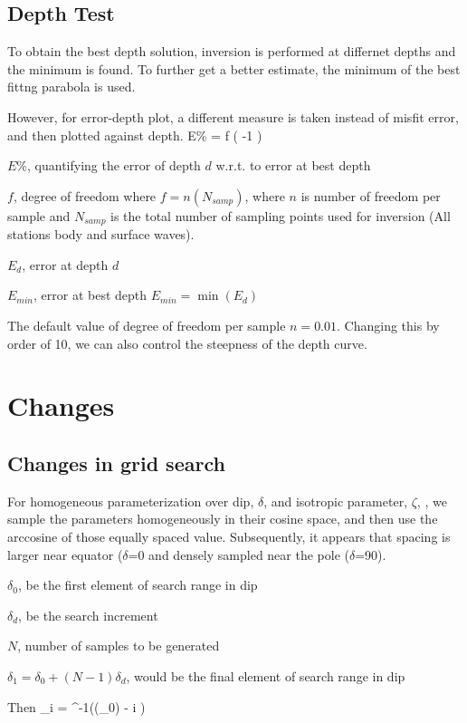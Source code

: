 \documentclass[11pt,titlepage,fleqn]{article}
\newcommand{\bdes}{\begin{description}}
\newcommand{\edes}{\end{description}}
\begin{document}
\subsection{Depth Test}
To obtain the best depth solution, inversion is performed at differnet depths and the minimum is found. To further get a better estimate, the minimum of the best fittng parabola is used.

However, for error-depth plot, a different measure is taken instead of misfit error, and then plotted against depth.
\eq
E\% = f \times \left (  -1 \right )
\en
\bdes
\item $E\%$, quantifying the error of depth $d$ w.r.t. to error at best depth
\item $f$, degree of freedom where $f = n (N_{samp})$, where $n$ is number of freedom per sample and $N_{samp}$ is the total number of sampling points used for inversion (All stations body and surface waves). 
\item $E_d$, error at depth $d$ 
\item $E_{min}$, error at best depth $E_{min} = \min(E_d)$
\edes
The default value of degree of freedom per sample $n =0.01$. Changing this by order of 10, we can also control the steepness of the depth curve.

\section{Changes}
\subsection{Changes in grid search}
For homogeneous parameterization over dip, $\delta$, and isotropic parameter, $\zeta$, \citep{TapeTape2012beach}, we sample the parameters homogeneously in their cosine space, and then use the arccosine of those equally spaced value. Subsequently, it appears that spacing is larger near equator ($\delta$=0 and densely sampled near the pole ($\delta$=90).

\bdes
\item $\delta_0$, be the first element of search range in dip
\item $\delta_d$, be the search increment
\item $N$, number of samples to be generated
\item $\delta_1 = \delta_0 + (N-1)\delta_d$, would be the final element of search range in dip
\edes

Then
\eq
\delta_i = \cos^{-1}\left ({\cos(\delta_0)} - i  \right)
\en
\end{document}
